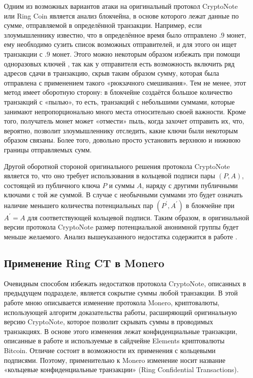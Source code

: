 \documentclass{mrl}
\theoremstyle{definition}
\numberwithin{thm}{section}
\begin{document}
Одним из возможных вариантов атаки на оригинальный протокол CryptoNote или Ring Coin \cite{CN,B2} является анализ блокчейна, в основе которого лежат данные по сумме, отправляемой в определённой транзакции. Например, если злоумышленнику известно, что в определённое время было отправлено $.9$ монет, ему необходимо сузить список возможных отправителей, и для этого он ищет транзакции с $.9$ монет. Этого можно некоторым образом избежать при помощи одноразовых ключей \cite{CN}, так как у отправителя есть возможность включить ряд адресов сдачи в транзакцию, скрыв таким образом сумму, которая была отправлена с применением такого «рюкзачного смешивания». Тем не менее, этот метод имеет оборотную сторону: в блокчейне создаётся большое количество транзакций с «пылью», то есть, транзакций с небольшими суммами, которые занимают непропорционально много места относительно своей важности. Кроме того, получатель монет может «отмести» пыль, когда захочет отправить их, что, вероятно, позволит злоумышленнику отследить, какие ключи были некоторым образом связаны. Более того, довольно просто установить верхнюю и нижнюю границы отправляемых сумм.

Другой оборотной стороной оригинального решения протокола CryptoNote является то, что оно требует использования в кольцевой подписи пары $\left(P,A\right)$, состоящей из публичного ключа $P$ и суммы $A$, наряду с другими публичными ключами с той же суммой. В случае с необычными суммами это будет означать наличие меньшего количества потенциальных пар $\left(P^{\prime},A^{\prime}\right)$ в блокчейне при $A^{\prime}=A$ для соответствующей кольцевой подписи. Таким образом, в оригинальной версии протокола CryptoNote размер потенциальной анонимной группы будет меньше желаемого. Анализ вышеуказанного недостатка содержится в работе \cite{mrl4}.

\subsection{Применение Ring CT в Monero}

Очевидным способом избежать недостатков протокола CryptoNote, описанных в предыдущем подразделе, является сокрытие суммы любой транзакции. В этой работе мною описывается изменение протокола Monero, криптовалюты, использующей алгоритм доказательства работы, расширяющий оригинальную версию CryptoNote, которое позволит скрывать суммы в проводимых транзакциях. В основе этого изменения лежат конфиденциальные транзакции, описанные в работе \cite{GM} и используемые в сайдчейне Elements криптовалюты Bitcoin. Отличие состоит в возможности их применения с кольцевыми подписями. Поэтому, применительно к Monero изменение носит название «кольцевые конфиденциальные транзакции» (Ring Confidential Transactions).
\end{document}
